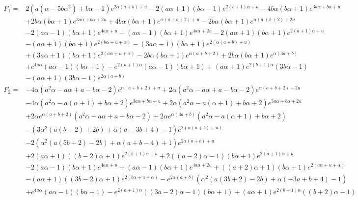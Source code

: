 \begin{align*}
    F_1 =& 2 \left(a \left(\alpha-5 b \alpha^2\right)+b \alpha-1\right) e^{2 \alpha (a+b)+u}-2 (a \alpha+1) (b \alpha-1) e^{2 (b+1) \alpha+u}-4 b \alpha (b \alpha+1) e^{3 a \alpha+b \alpha+u} \\
    &+2 b \alpha (b \alpha+1) e^{3 a \alpha+b \alpha+2 u}+4 b \alpha (b \alpha+1) e^{\alpha (a+b+2)+u}-2 b \alpha (b \alpha+1) e^{\alpha (a+b+2)+2 u} \\
    &-2 (a \alpha-1) (b \alpha+1) e^{4 a \alpha+u}+(a \alpha-1) (b \alpha+1) e^{4 a \alpha+2 u}-2 (a \alpha+1) (b \alpha+1) e^{2 (a+1) \alpha+u} \\
    &-(a \alpha+1) (b \alpha+1) e^{2 (b \alpha+u+\alpha)}-(3 a \alpha-1) (b \alpha+1) e^{2 (\alpha (a+b)+u)} \\
    &+(3 a \alpha+1) (b \alpha+1) e^{2 (a \alpha+u+\alpha)}-2 b \alpha (b \alpha+1) e^{\alpha (a+b+2)}+2 b \alpha (b \alpha+1) e^{\alpha (3 a+b)} \\
    &+e^{4 a \alpha} (a \alpha-1) (b \alpha+1)-e^{2 (a+1) \alpha} (a \alpha-1) (b \alpha+1)+(a \alpha+1) e^{2 (b+1) \alpha} (3 b \alpha-1) \\
    &-(a \alpha+1) (3 b \alpha-1) e^{2 \alpha (a+b)} \\
    F_2 =& -4 \alpha \left(a^2 \alpha-a \alpha+a-b \alpha-2\right) e^{\alpha (a+b+2)+u}+2 \alpha \left(a^2 \alpha-a \alpha+a-b \alpha-2\right) e^{\alpha (a+b+2)+2 u} \\
    &-4 \alpha \left(a^2 \alpha-a (\alpha+1)+b \alpha+2\right) e^{3 a \alpha+b \alpha+u}+2 \alpha \left(a^2 \alpha-a (\alpha+1)+b \alpha+2\right) e^{3 a \alpha+b \alpha+2 u} \\
    &+2 \alpha e^{\alpha (a+b+2)} \left(a^2 \alpha-a \alpha+a-b \alpha-2\right)+2 \alpha e^{\alpha (3 a+b)} \left(a^2 \alpha-a (\alpha+1)+b \alpha+2\right) \\
    &-\left(3 \alpha^2 (a (b-2)+2 b)+\alpha (a-3 b+4)-1\right) e^{2 (\alpha (a+b)+u)} \\
    &-2 \left(\alpha^2 (a (5 b+2)-2 b)+\alpha (a+b-4)+1\right) e^{2 \alpha (a+b)+u} \\
    &+2 (a \alpha+1) ((b-2) \alpha+1) e^{2 (b+1) \alpha+u}+2 ((a-2) \alpha-1) (b \alpha+1) e^{2 (a+1) \alpha+u} \\
    &-2 (a \alpha-1) (b \alpha+1) e^{4 a \alpha+u}+(a \alpha-1) (b \alpha+1) e^{4 a \alpha+2 u}+((a+2) \alpha+1) (b \alpha+1) e^{2 (a \alpha+u+\alpha)} \\
    &-(a \alpha+1) ((3 b-2) \alpha+1) e^{2 (b \alpha+u+\alpha)}-e^{2 \alpha (a+b)} \left(\alpha^2 (a (3 b+2)-2 b)+\alpha (-3 a+b+4)-1\right) \\
    &+e^{4 a \alpha} (a \alpha-1) (b \alpha+1)-e^{2 (a+1) \alpha} ((3 a-2) \alpha-1) (b \alpha+1)+(a \alpha+1) e^{2 (b+1) \alpha} ((b+2) \alpha-1)
\end{align*}
